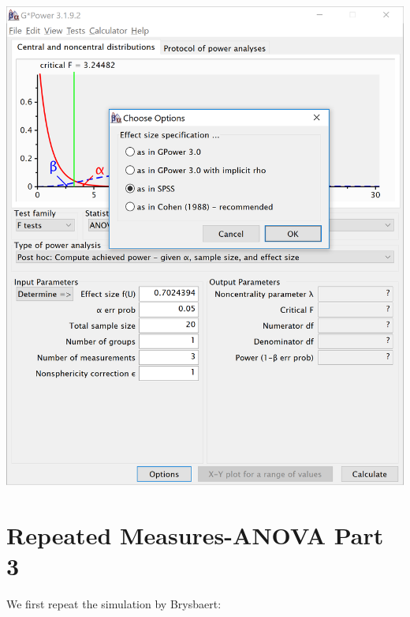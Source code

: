 \documentclass[]{book}
\begin{document}
\includegraphics{screenshots/gpower_14.png}

\hypertarget{repeated-measures-anova-part-3}{%
\chapter{Repeated Measures-ANOVA Part 3}\label{repeated-measures-anova-part-3}}

We first repeat the simulation by Brysbaert:
\end{document}

